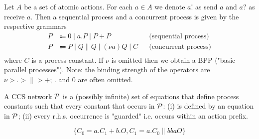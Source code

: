 

\begin{definition}
 Let $A$ be a set of atomic actions.
 For each $a \in A$ we denote $a!$ as send $a$ and $a?$ as receive $a$.
 Then a sequential process and a concurrent process is given by the respective grammars 
 \begin{align*}
     P & \Coloneqq 0 \;|\; a.P \;|\; P + P && \text{(sequential process)} \\
    P & \Coloneqq P \;|\; Q \parallel  Q \;|\; (\nu a) Q  \;|\; C && \text{(concurrent process)} \\
 \end{align*}
 where $C$ is a process constant.
 If $\nu$ is omitted then we obtain a BPP ("basic parallel processes").
 Note: the binding strength of the operators are $\nu > . > \parallel  > +$; $.$ and $0$ are often omitted.
 \end{definition}
 

\begin{definition}
    A CCS network $\mathcal{P}$ is a (possibly infinite) set of equations that define process constants such that every constant that occurs in $\mathcal{P}$: 
    (i) is defined by an equation in $\mathcal{P}$; 
    (ii) every r.h.s. occurrence is "guarded" i.e. occurs within an action prefix.
\end{definition}

\begin{example}
	$$\{C_0 = a.C_1 + b.O, C_1 = a.C_0 \parallel bbaO\}$$
\end{example}

